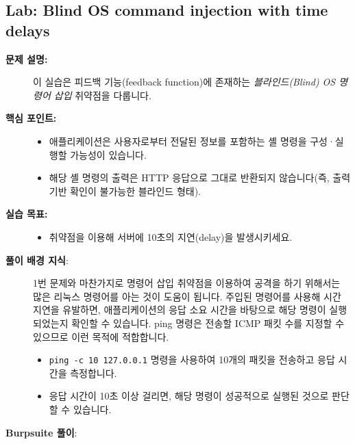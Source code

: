 \documentclass{article}
\begin{document}
\subsection*{Lab: Blind OS command injection with time delays}
\begin{description}
  \item[\textbf{문제 설명:}] 이 실습은 피드백 기능(feedback function)에 존재하는 \emph{블라인드(Blind) OS 명령어 삽입} 취약점을 다룹니다.

  \item[\textbf{핵심 포인트:}]\leavevmode\par
    \begin{itemize}
      \item 애플리케이션은 사용자로부터 전달된 정보를 포함하는 셸 명령을 구성·실행할 가능성이 있습니다.
      \item 해당 셸 명령의 출력은 HTTP 응답으로 그대로 반환되지 않습니다(즉, 출력 기반 확인이 불가능한 블라인드 형태).
    \end{itemize}

  \item[\textbf{실습 목표:}]\leavevmode\par
    \begin{itemize}
      \item 취약점을 이용해 서버에 10초의 지연(delay)을 발생시키세요.
    \end{itemize}

  \item[\textbf{풀이 배경 지식}:]\leavevmode\par
    1번 문제와 마찬가지로 명령어 삽입 취약점을 이용하여 공격을 하기 위해서는 많은 리눅스 명령어를 아는 것이 도움이 됩니다.
    주입된 명령어를 사용해 시간 지연을 유발하면, 애플리케이션의 응답 소요 시간을 바탕으로 해당 명령이 실행되었는지 확인할 수 있습니다. 
    ping 명령은 전송할 ICMP 패킷 수를 지정할 수 있으므로 이런 목적에 적합합니다. 

    \begin{itemize}
      \item \texttt{ping -c 10 127.0.0.1} 명령을 사용하여 10개의 패킷을 전송하고 응답 시간을 측정합니다.
      \item 응답 시간이 10초 이상 걸리면, 해당 명령이 성공적으로 실행된 것으로 판단할 수 있습니다.
    \end{itemize}

    \item[\textbf{Burpsuite 풀이}:] \leavevmode\par


\end{description}
\end{document}
